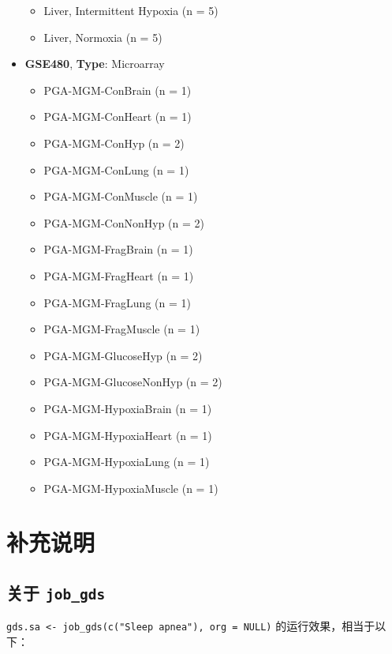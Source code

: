 \documentclass[
]{article}
\providecommand{\tightlist}{%
  \setlength{\itemsep}{0pt}\setlength{\parskip}{0pt}}
\begin{document}
\begin{itemize}
  \begin{itemize}
  \tightlist
  \item
    Liver, Intermittent Hypoxia (n = 5)
  \item
    Liver, Normoxia (n = 5)
  \end{itemize}
\item
  \textbf{GSE480}, \textbf{Type}: Microarray

  \begin{itemize}
  \tightlist
  \item
    PGA-MGM-ConBrain (n = 1)
  \item
    PGA-MGM-ConHeart (n = 1)
  \item
    PGA-MGM-ConHyp (n = 2)
  \item
    PGA-MGM-ConLung (n = 1)
  \item
    PGA-MGM-ConMuscle (n = 1)
  \item
    PGA-MGM-ConNonHyp (n = 2)
  \item
    PGA-MGM-FragBrain (n = 1)
  \item
    PGA-MGM-FragHeart (n = 1)
  \item
    PGA-MGM-FragLung (n = 1)
  \item
    PGA-MGM-FragMuscle (n = 1)
  \item
    PGA-MGM-GlucoseHyp (n = 2)
  \item
    PGA-MGM-GlucoseNonHyp (n = 2)
  \item
    PGA-MGM-HypoxiaBrain (n = 1)
  \item
    PGA-MGM-HypoxiaHeart (n = 1)
  \item
    PGA-MGM-HypoxiaLung (n = 1)
  \item
    PGA-MGM-HypoxiaMuscle (n = 1)
  \end{itemize}
\end{itemize}

\hypertarget{ux8865ux5145ux8bf4ux660e}{%
\section{补充说明}\label{ux8865ux5145ux8bf4ux660e}}

\hypertarget{ux5173ux4e8e-job_gds}{%
\subsection{\texorpdfstring{关于 \texttt{job\_gds}}{关于 job\_gds}}\label{ux5173ux4e8e-job_gds}}

\texttt{gds.sa\ \textless{}-\ job\_gds(c("Sleep\ apnea"),\ org\ =\ NULL)} 的运行效果，相当于以下：
\end{document}
